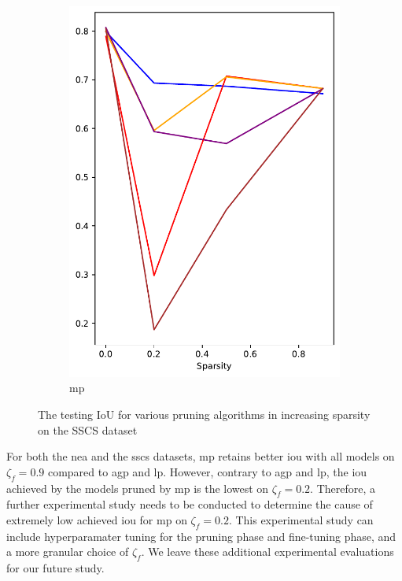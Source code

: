 \documentclass[mathematics,article,submit,pdftex,moreauthors]{Definitions/mdpi}
\begin{document}
\begin{figure}[!ht]
\begin{subfigure}[t]{.274\textwidth}
        \includegraphics[width=.95\linewidth]{figures/test/pruning-testing-score_CCSC_movement.pdf}
        \caption{\ac{mp}}
        \label{fig:results:test:sscs:mp}
      \end{subfigure}
      \caption{The testing IoU for various pruning algorithms in increasing sparsity on the SSCS dataset}
      \label{fig:results:test:sscs}
\end{figure}

For both the \ac{nea}
and the \ac{sscs} datasets, \ac{mp} retains
better \ac{iou} with all models on $\zeta_f=0.9$
compared to \ac{agp} and \ac{lp}.
However, contrary to \ac{agp} and \ac{lp},
the \ac{iou} achieved by the models pruned by \ac{mp}
is the lowest on $\zeta_f=0.2$. 
Therefore, a further experimental study
needs to be conducted to determine the cause
of extremely low achieved \ac{iou} for \ac{mp}
on $\zeta_f=0.2$. This experimental study
can include hyperparamater tuning for the pruning phase
and fine-tuning phase, and a more granular
choice of $\zeta_f$. We leave these additional experimental
evaluations for our future study.
\end{document}
